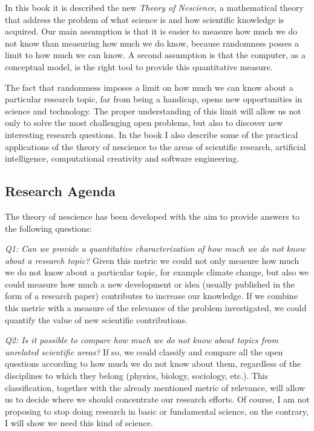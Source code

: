 In this book it is described the new \emph{Theory of Nescience}, a mathematical theory that address the problem of what science is and how scientific knowledge is acquired. Our main assumption is that it is easier to measure how much we do not know than measuring how much we do know, because randomness posses a limit to how much we can know. A second assumption is that the computer, as a conceptual model, is the right tool to provide this quantitative measure.

The fact that randomness imposes a limit on how much we can know about a particular research topic, far from being a handicap, opens new opportunities in science and technology. The proper understanding of this limit will allow us not only to solve the most challenging open problems, but also to discover new interesting research questions. In the book I also describe some of the practical applications of the theory of nescience to the areas of scientific research, artificial intelligence, computational creativity and software engineering.

%
%

\subsection*{Research Agenda}

The theory of nescience has been developed with the aim to provide answers to the following questions:

\emph{Q1: Can we provide a quantitative characterization of how much we do not know about a research topic?} Given this metric we could not only measure how much we do not know about a particular topic, for example climate change, but also we could measure how much a new development or idea (usually published in the form of a research paper) contributes to increase our knowledge. If we combine this metric with a measure of the relevance of the problem investigated, we could quantify the value of new scientific contributions.

\emph{Q2: Is it possible to compare how much we do not know about topics from unrelated scientific areas?} If so, we could classify and compare all the open questions according to how much we do not know about them, regardless of the disciplines to which they belong (physics, biology, sociology, etc.). This classification, together with the already mentioned metric of relevance, will allow us to decide where we should concentrate our research efforts. Of course, I am not proposing to stop doing research in basic or fundamental science, on the contrary, I will show we need this kind of science.

